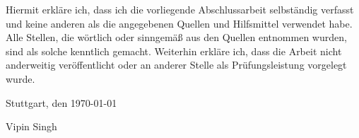 Hiermit erkläre ich, dass ich die vorliegende Abschlussarbeit selbständig verfasst und  keine anderen als die angegebenen Quellen und Hilfsmittel verwendet habe.
Alle Stellen, die wörtlich oder sinngemäß aus den Quellen entnommen wurden, sind als solche kenntlich gemacht.
Weiterhin erkläre ich, dass die Arbeit nicht anderweitig veröffentlicht oder an anderer Stelle als Prüfungsleistung vorgelegt wurde.

\vspace{2mm}
\begin{flushleft}
Stuttgart, den \today

\vspace{10mm}
\makebox[7cm][l]{\hrulefill}

Vipin Singh


\end{flushleft}